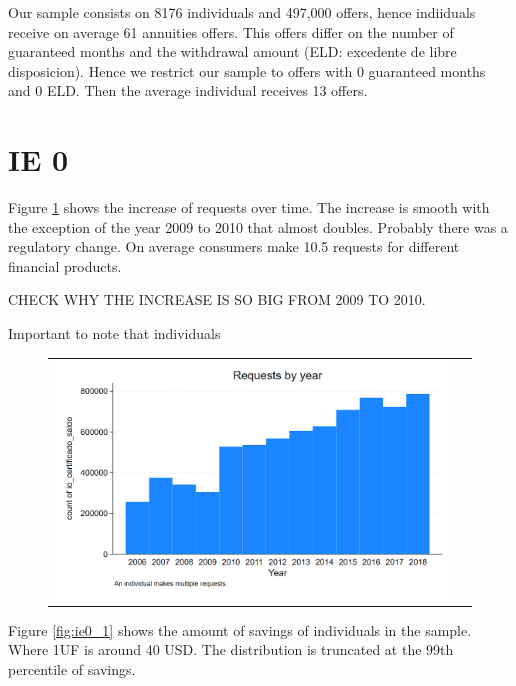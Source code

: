 \documentclass[12pt]{article}
\begin{document}
Our sample consists on 8176 individuals and 497,000 offers, hence indiiduals receive on average 61 annuities offers. This offers differ on the number of guaranteed months and the withdrawal amount (ELD: excedente de libre disposicion). Hence we restrict our sample to offers with 0 guaranteed months and 0 ELD. Then the average individual receives 13 offers. 








\section{IE 0}

Figure \ref{fig:ie0_0} shows the increase of requests over time. The increase is smooth with the exception of the year 2009 to 2010 that almost doubles. Probably there was a regulatory change. 
On average consumers make 10.5 requests for different financial products. 

CHECK WHY THE INCREASE IS SO BIG FROM 2009 TO 2010.

Important to note that individuals 
\begin{figure}[H]
\caption{}
\label{fig:ie0_0}
\centering{}%
\begin{tabular}{cc}
\includegraphics[scale=0.27]{../figures/IE0_plot0.png}
\end{tabular}
\end{figure}


Figure \ref{fig:ie0_1} shows the amount of savings of individuals in the sample. Where 1UF is around 40 USD. The distribution is truncated at the 99th percentile of savings. 
\end{document}
